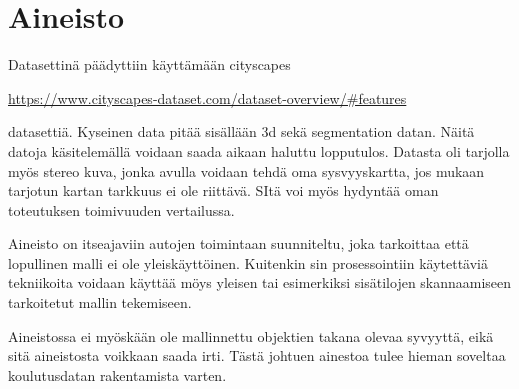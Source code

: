 \chapter{Aineisto}%
\label{ch:aineisto}

Datasettinä päädyttiin käyttämään  cityscapes 

\url{https://www.cityscapes-dataset.com/dataset-overview/#features}

datasettiä. Kyseinen data pitää sisällään 3d sekä segmentation datan. Näitä datoja käsitelemällä voidaan saada aikaan haluttu lopputulos. Datasta oli tarjolla myös stereo kuva, jonka avulla voidaan tehdä oma sysvyyskartta, jos mukaan tarjotun kartan tarkkuus ei ole riittävä. SItä voi myös hydyntää oman toteutuksen toimivuuden vertailussa.

Aineisto on itseajaviin autojen toimintaan suunniteltu, joka tarkoittaa että lopullinen malli ei ole yleiskäyttöinen. Kuitenkin sin prosessointiin käytettäviä tekniikoita voidaan käyttää möys yleisen tai esimerkiksi sisätilojen skannaamiseen tarkoitetut mallin tekemiseen.

Aineistossa ei myöskään ole mallinnettu objektien takana olevaa syvyyttä, eikä sitä aineistosta voikkaan saada irti. Tästä johtuen ainestoa tulee hieman soveltaa koulutusdatan rakentamista varten.